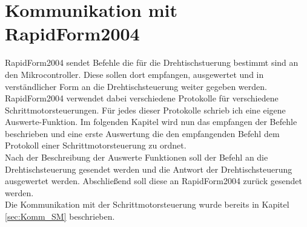 \section{Kommunikation mit RapidForm2004}
\label{sec:Komm_RF2004}
RapidForm2004 sendet Befehle die für die Drehtischstuerung bestimmt sind an den Mikrocontroller. Diese sollen dort empfangen, ausgewertet und in verständlicher Form an die Drehtischsteuerung weiter gegeben werden. RapidForm2004 verwendet dabei verschiedene Protokolle für verschiedene Schrittmotorsteuerungen. Für jedes dieser Protokolle schrieb ich eine eigene Auswerte-Funktion. Im folgenden Kapitel wird nun das empfangen der Befehle beschrieben und eine erste Auswertung die den empfangenden Befehl dem Protokoll einer Schrittmotorsteuerung zu ordnet.\\
Nach der Beschreibung der Auswerte Funktionen soll der Befehl an die Drehtischsteuerung gesendet werden und die Antwort der Drehtischsteuerung ausgewertet werden.
Abschließend soll diese an RapidForm2004 zurück gesendet werden. \\
Die Kommunikation mit der Schrittmotorsteuerung wurde bereits in Kapitel \ref{sec:Komm_SM} beschrieben. 
